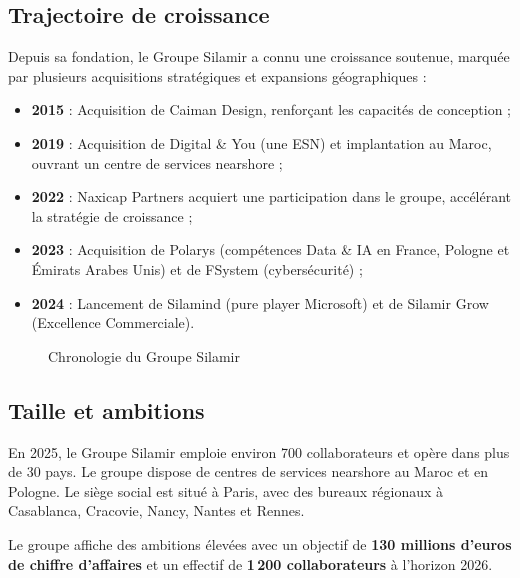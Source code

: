 \subsection{Trajectoire de croissance}

Depuis sa fondation, le Groupe Silamir a connu une croissance soutenue, marquée par plusieurs acquisitions stratégiques et expansions géographiques :

\begin{itemize}
    \item \textbf{2015} : Acquisition de Caiman Design, renforçant les capacités de conception ;
    \item \textbf{2019} : Acquisition de Digital \& You (une ESN) et implantation au Maroc, ouvrant un centre de services nearshore ;
    \item \textbf{2022} : Naxicap Partners acquiert une participation dans le groupe, accélérant la stratégie de croissance ;
    \item \textbf{2023} : Acquisition de Polarys (compétences Data \& IA en France, Pologne et Émirats Arabes Unis) et de FSystem (cybersécurité) ;
    \item \textbf{2024} : Lancement de Silamind (pure player Microsoft) et de Silamir Grow (Excellence Commerciale).
\end{itemize}

\begin{figure}[htbp]
    \centering
    \caption{Chronologie du Groupe Silamir}
    \label{fig:silamir_timeline}
\end{figure}

\subsection{Taille et ambitions}

En 2025, le Groupe Silamir emploie environ 700 collaborateurs et opère dans plus de 30 pays. Le groupe dispose de centres de services nearshore au Maroc et en Pologne. Le siège social est situé à Paris, avec des bureaux régionaux à Casablanca, Cracovie, Nancy, Nantes et Rennes.

Le groupe affiche des ambitions élevées avec un objectif de \textbf{130 millions d'euros de chiffre d'affaires} et un effectif de \textbf{1\,200 collaborateurs} à l'horizon 2026.

